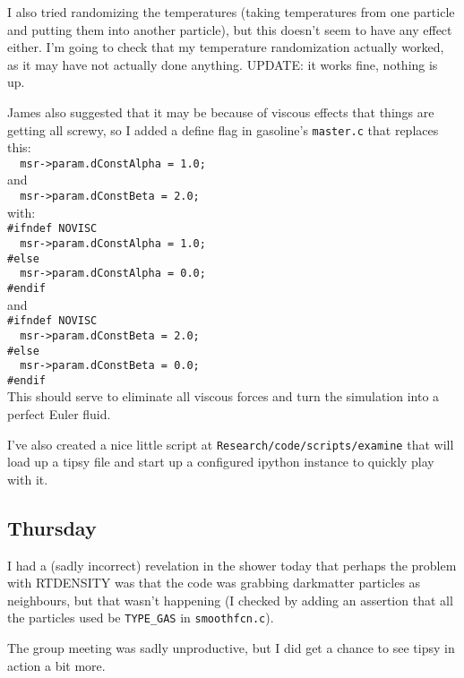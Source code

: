 \documentclass[11pt,letterpaper]{article}
\begin{document}
I also tried randomizing the temperatures (taking temperatures from one particle
and putting them into another particle), but this doesn't seem to have any 
effect either.  I'm going to check that my temperature randomization actually
worked, as it may have not actually done anything.  UPDATE: it works fine, 
nothing is up.

James also suggested that it may be because of viscous effects that things are
getting all screwy, so I added a define flag in gasoline's \verb!master.c! 
that replaces this:\\
\verb!	msr->param.dConstAlpha = 1.0;!\\
and\\
\verb!	msr->param.dConstBeta = 2.0;!\\
with:\\
\verb!#ifndef NOVISC!\\
\verb!	msr->param.dConstAlpha = 1.0;!\\
\verb!#else!\\
\verb!	msr->param.dConstAlpha = 0.0;!\\
\verb!#endif!\\
and\\
\verb!#ifndef NOVISC!\\
\verb!	msr->param.dConstBeta = 2.0;!\\
\verb!#else!\\
\verb!	msr->param.dConstBeta = 0.0;!\\
\verb!#endif!\\
This should serve to eliminate all viscous forces and turn the simulation into
a perfect Euler fluid.

I've also created a nice little script at \verb!Research/code/scripts/examine!
that will load up a tipsy file and start up a configured ipython instance to
quickly play with it.

\subsection*{Thursday}
I had a (sadly incorrect) revelation in the shower today that perhaps the 
problem with RTDENSITY was that the code was grabbing darkmatter particles as
neighbours, but that wasn't happening (I checked by adding an assertion that 
all the particles used be \verb!TYPE_GAS! in \verb!smoothfcn.c!).

The group meeting was sadly unproductive, but I did get a chance to see tipsy 
in action a bit more.
\end{document}
